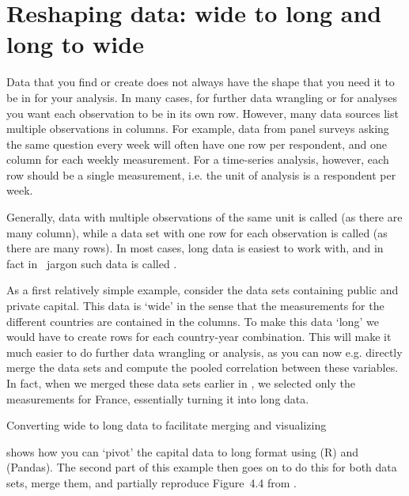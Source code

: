 \section{Reshaping data: wide to long and long to wide}\label{sec:pivot}

Data that you find or create does not always have the shape that you need it to be in for your analysis.
In many cases, for further data wrangling or for analyses you want each observation to be in its own row.
However, many data sources list multiple observations in columns.
For example, data from panel surveys asking the same question every week will often have one row per respondent,
and one column for each weekly measurement.
For a time-series analysis, however, each row should be a single measurement,
i.e. the unit of analysis is a respondent per week.

Generally, data with multiple observations of the same unit is called  (as there are many column),
while a data set with one row for each observation is called  (as there are many rows).
In most cases, long data is easiest to work with, and in fact in \tidyverse\ jargon such data is called .

As a first relatively simple example, consider the data sets containing public and private capital.
This data is `wide' in the sense that the measurements for the different countries are contained in the columns.
To make this data `long' we would have to create rows for each country-year combination.
This will make it much easier to do further data wrangling or analysis, as you can now e.g. directly merge the data sets and compute the pooled correlation between these variables. 
In fact, when we merged these data sets earlier in , we selected only the measurements for France, essentially turning it into long data.

\begin{ccsexample}
  \caption{Converting wide to long data to facilitate merging and visualizing}\label{ex:merge}
\end{ccsexample}

 shows how you can `pivot' the capital data to long format using  (R) and  (Pandas). The second part of this example then goes on to do this for both data sets, merge them, and partially reproduce Figure~4.4 from \citet{piketty}.

